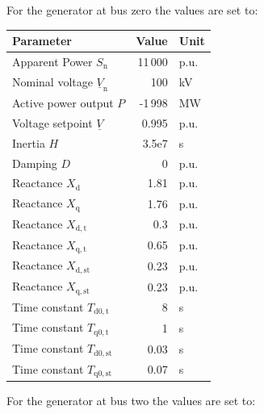 \vspace*{1cm}

For the generator at bus zero the values are set to:

\begin{tabularx}{\textwidth}{Xrl}
    \textbf{Parameter} & \textbf{Value} & \textbf{Unit} \\ \hline
    \toprule
    Apparent Power $S_\mathrm{n}$ & 11\,000 & p.u. \\
    Nominal voltage $\underline{V}_\mathrm{n}$ & 100 & kV \\
    Active power output $P$ & -1\,998 & MW \\
    Voltage setpoint $\underline{V}$ & 0.995 & p.u. \\
    Inertia $H$ & 3.5e7 & s \\
    Damping $D$ & 0 & p.u. \\
    Reactance $X_\mathrm{d}$ & 1.81 & p.u. \\
    Reactance $X_\mathrm{q}$ & 1.76 & p.u. \\
    Reactance $X_\mathrm{d,t}$ & 0.3 & p.u. \\
    Reactance $X_\mathrm{q,t}$ & 0.65 & p.u. \\
    Reactance $X_\mathrm{d,st}$ & 0.23 & p.u. \\
    Reactance $X_\mathrm{q,st}$ & 0.23 & p.u. \\
    Time constant $T_\mathrm{d0,t}$ & 8 & s \\
    Time constant $T_\mathrm{q0,t}$ & 1 & s \\
    Time constant $T_\mathrm{d0,st}$ & 0.03 & s \\
    Time constant $T_\mathrm{q0,st}$ & 0.07 & s \\
    \bottomrule
\end{tabularx}

\vspace*{1cm}

For the generator at bus two the values are set to:

